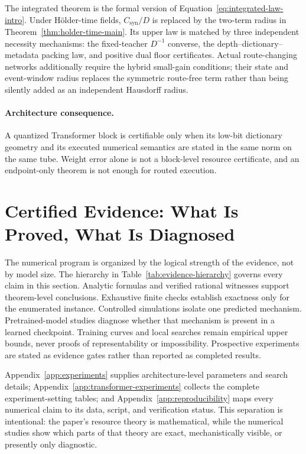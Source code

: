 \documentclass[twoside,11pt]{article}
\begin{document}
The integrated theorem is the formal version of Equation~\eqref{eq:integrated-law-intro}.  Under H\"older-time fields, $C_{\mathrm{syn}}/D$ is replaced by the two-term radius in Theorem~\ref{thm:holder-time-main}.  Its upper law is matched by three independent necessity mechanisms: the fixed-teacher $D^{-1}$ converse, the depth--dictionary--metadata packing law, and positive dual floor certificates.  Actual route-changing networks additionally require the hybrid small-gain conditions; their state and event-window radius replaces the symmetric route-free term rather than being silently added as an independent Hausdorff radius.

\paragraph{Architecture consequence.}
A quantized Transformer block is certifiable only when its low-bit dictionary geometry and its executed numerical semantics are stated in the same norm on the same tube.  Weight error alone is not a block-level resource certificate, and an endpoint-only theorem is not enough for routed execution.

\section{Certified Evidence: What Is Proved, What Is Diagnosed}
\label{sec:certified-evidence-main}
\label{sec:evidence}

The numerical program is organized by the logical strength of the evidence, not by model size.  The hierarchy in Table~\ref{tab:evidence-hierarchy} governs every claim in this section.  Analytic formulas and verified rational witnesses support theorem-level conclusions.  Exhaustive finite checks establish exactness only for the enumerated instance.  Controlled simulations isolate one predicted mechanism.  Pretrained-model studies diagnose whether that mechanism is present in a learned checkpoint.  Training curves and local searches remain empirical upper bounds, never proofs of representability or impossibility.  Prospective experiments are stated as evidence gates rather than reported as completed results.

Appendix~\ref{app:experiments} supplies architecture-level parameters and search details; Appendix~\ref{app:transformer-experiments} collects the complete experiment-setting tables; and Appendix~\ref{app:reproducibility} maps every numerical claim to its data, script, and verification status.  This separation is intentional: the paper's resource theory is mathematical, while the numerical studies show which parts of that theory are exact, mechanistically visible, or presently only diagnostic.
\end{document}
